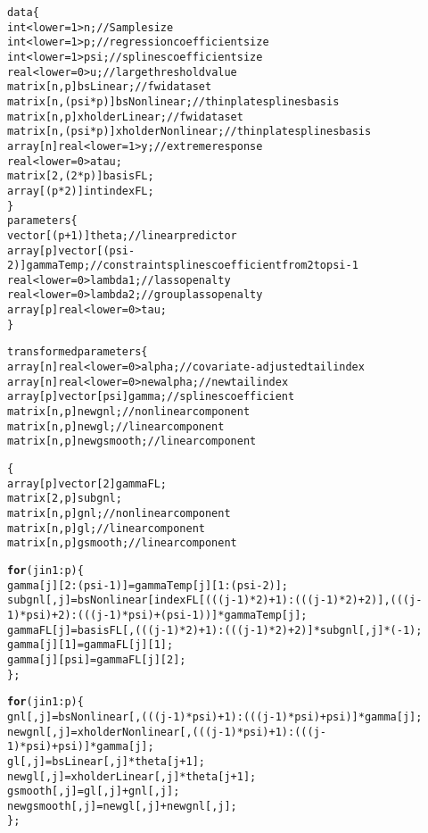 \documentclass{article}\usepackage[]{graphicx}\usepackage[]{xcolor}
\makeatletter
\newcommand{\hlkwd}[1]{\textcolor[rgb]{0.737,0.353,0.396}{\textbf{#1}}}%
\newenvironment{kframe}{%
 \def\at@end@of@kframe{}%
 \ifinner\ifhmode%
  \def\at@end@of@kframe{\end{minipage}}%
  \begin{minipage}{\columnwidth}%
 \fi\fi%
 \def\FrameCommand##1{\hskip\@totalleftmargin \hskip-\fboxsep
 \colorbox{shadecolor}{##1}\hskip-\fboxsep
     \hskip-\linewidth \hskip-\@totalleftmargin \hskip\columnwidth}%
 \MakeFramed {\advance\hsize-\width
   \@totalleftmargin\z@ \linewidth\hsize
   \@setminipage}}%
 {\par\unskip\endMakeFramed%
 \at@end@of@kframe}
\newenvironment{knitrout}{}{} %
\makeatother
\begin{document}
\begin{knitrout}
\color{fgcolor}\begin{kframe}
\begin{alltt}
data \{
    int <lower=1> n; // Sample size
    int <lower=1> p; // regression coefficient size
    int <lower=1> psi; // splines coefficient size
    real <lower=0> u; // large threshold value
    matrix[n,p] bsLinear; // fwi dataset
    matrix[n, (psi*p)] bsNonlinear; // thin plate splines basis
    matrix[n,p] xholderLinear; // fwi dataset
    matrix[n, (psi*p)] xholderNonlinear; // thin plate splines basis    
    array[n] real <lower=1> y; // extreme response
    real <lower=0> atau;
    matrix[2, (2*p)] basisFL;
    array[(p*2)] int indexFL;
\}
parameters \{
    vector[(p+1)] theta; // linear predictor
    array[p] vector[(psi-2)] gammaTemp; // constraint splines coefficient from 2 to psi-1
    real <lower=0> lambda1; // lasso penalty
    real <lower=0> lambda2; // group lasso penalty
    array[p] real <lower=0> tau;
\}

transformed parameters \{
    array[n] real <lower=0> alpha; // covariate-adjusted tail index
    array[n] real <lower=0> newalpha; // new tail index
    array[p] vector[psi] gamma; // splines coefficient
    matrix[n, p] newgnl; // nonlinear component
    matrix[n, p] newgl; // linear component
    matrix[n, p] newgsmooth; // linear component
    
    \{
      array[p] vector[2] gammaFL;
      matrix[2, p] subgnl;
      matrix[n, p] gnl; // nonlinear component
      matrix[n, p] gl; // linear component
      matrix[n, p] gsmooth; // linear component


      \hlkwd{for}(j in 1:p)\{
          gamma[j][2:(psi-1)] = gammaTemp[j][1:(psi-2)];
          subgnl[,j] = bsNonlinear[indexFL[(((j-1)*2)+1):(((j-1)*2)+2)], (((j-1)*psi)+2):(((j-1)*psi)+(psi-1))] * gammaTemp[j];
          gammaFL[j] = basisFL[, (((j-1)*2)+1):(((j-1)*2)+2)] * subgnl[,j] * (-1);
          gamma[j][1] = gammaFL[j][1];
          gamma[j][psi] = gammaFL[j][2];  
      \};
      
      \hlkwd{for} (j in 1:p)\{
          gnl[,j] = bsNonlinear[,(((j-1)*psi)+1):(((j-1)*psi)+psi)] * gamma[j];
          newgnl[,j] = xholderNonlinear[,(((j-1)*psi)+1):(((j-1)*psi)+psi)] * gamma[j];
          gl[,j] = bsLinear[,j] * theta[j+1];
          newgl[,j] = xholderLinear[,j] * theta[j+1];
          gsmooth[,j] = gl[,j] + gnl[,j];
          newgsmooth[,j] = newgl[,j] + newgnl[,j];
      \};


\end{alltt}
\end{kframe}
\end{knitrout}
\end{document}
